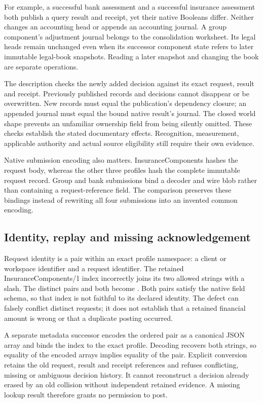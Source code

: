 For example, a successful bank assessment and a successful insurance assessment
both publish a query result and receipt, yet their native Booleans differ.
Neither changes an accounting head or appends an accounting journal. A group
component's adjustment journal belongs to the consolidation worksheet. Its
legal heads remain unchanged even when its successor component state refers to
later immutable legal-book snapshots. Reading a later snapshot and changing the
book are separate operations.

The description checks the newly added decision against its exact request,
result and receipt. Previously published records and decisions cannot disappear
or be overwritten. New records must equal the publication's dependency closure;
an appended journal must equal the bound native result's journal. The closed
world shape prevents an unfamiliar ownership field from being silently omitted.
These checks establish the stated documentary effects. Recognition,
measurement, applicable authority and actual source eligibility still require
their own evidence.

Native submission encoding also matters. InsuranceComponents hashes the request
body, whereas the other three profiles hash the complete immutable request
record. Group and bank submissions bind a decoder and wire blob rather than
containing a request-reference field. The comparison preserves these bindings
instead of rewriting all four submissions into an invented common encoding.

\subsection{Identity, replay and missing acknowledgement}

Request identity is a pair within an exact profile namespace: a client or
workspace identifier and a request identifier. The retained InsuranceComponents/1
index incorrectly joins its two allowed strings with a slash. The distinct pairs
 and  both become .
Both pairs satisfy the native field schema, so that index is not faithful to its
declared identity. The defect can falsely conflict distinct requests; it does
not establish that a retained financial amount is wrong or that a duplicate
posting occurred.

A separate metadata successor encodes the ordered pair as a canonical JSON
array and binds the index to the exact profile. Decoding recovers both strings,
so equality of the encoded arrays implies equality of the pair. Explicit
conversion retains the old request, result and receipt references and refuses
conflicting, missing or ambiguous decision history. It cannot reconstruct a
decision already erased by an old collision without independent retained
evidence. A missing lookup result therefore grants no permission to post.

